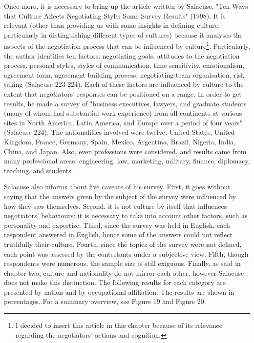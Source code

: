 \documentclass[../main.tex]{subfiles}
\begin{document}
Once more, it is necessary to bring up the article written by Salacuse, "Ten Ways that Culture Affects Negotiating Style: Some Survey Results" (1998)\cite{salacuse}. It is relevant (other than providing us with some insights in defining culture, particularly in distinguishing different types of cultures) because it analyses the aspects of the negotiation process that can be influenced by culture\footnote{I decided to insert this article in this chapter because of its relevance regarding the negotiators' actions and cognition.}. Particularly, the author identifies ten factors: negotiating goals, attitudes to the negotiation process, personal styles, styles of communication, time sensitivity, emotionalism, agreement form, agreement building process, negotiating team organisation, risk taking (Salacuse 223-224). 
Each of these factors are influenced by culture to the extent that negotiators' responses can be positioned on a range. In order to get results, he made a survey of "business executives, lawyers, and graduate students (many of whom had substantial work experience) from all continents at various sites in North America, Latin America, and Europe over a period of four years" (Salacuse 224).
The nationalities involved were twelve: United States, United Kingdom, France, Germany, Spain, Mexico, Argentina, Brazil, Nigeria, India, China, and Japan. Also, even professions were considered, and results came from many professional areas: engineering, law, marketing, military, finance, diplomacy, teaching, and students.

Salacuse also informs about five caveats of his survey. First, it goes without saying that the answers given by the subject of the survey were influenced by how they saw themselves. Second, it is not culture by itself that influences negotiators' behaviours: it is necessary to take into account other factors, such as personality and expertise. Third, since the survey was held in English, each respondent answered in English, hence some of the answers could not reflect truthfully their culture. Fourth, since the topics of the survey were not defined, each point was assessed by the contestants under a subjective view. Fifth, though respondents were numerous, the sample size is still exiguous. Finally, as said in chapter two, culture and nationality do not mirror each other, however Salacuse does not make this distinction. 
The following results for each category are presented by nation and by occupational affiliation. The results are shown in percentages. For a summary overview, see Figure 19 and Figure 20.
\end{document}

